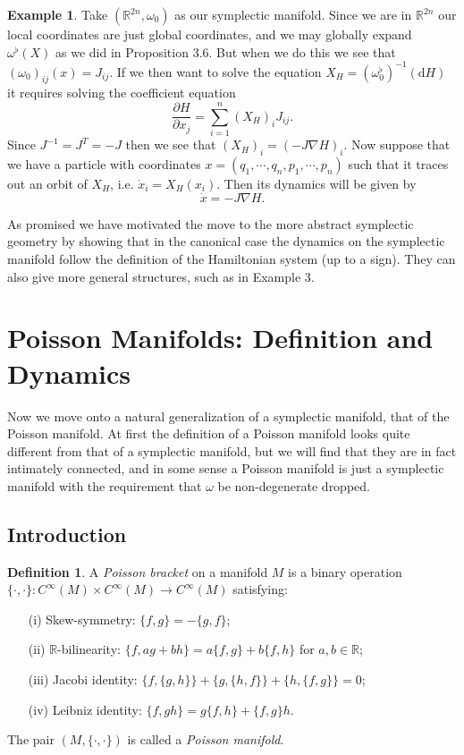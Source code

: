 \documentclass[psamsfonts,12pt]{amsart}
\newcommand\td{\mathrm{d}}
\newcommand\0{\mathbf{0}}
\newcommand\inv{^{-1}}
\theoremstyle{plain}
\theoremstyle{definition}
\newtheorem{dfn}[thm]{Definition} %
\newtheorem{ex}[thm]{Example} %
\newcommand{\bbR}{\mathbb{R}}
\begin{document}
\begin{ex}
Take $(\bbR^{2n},\omega_0)$ as our symplectic manifold.  Since we are in $\bbR^{2n}$ our local coordinates are just global coordinates, and we may globally expand $\omega^\flat(X)$ as we did in Proposition 3.6.  But when we do this we see that $(\omega_0)_{ij}(x)=J_{ij}$.  If we then want to solve the equation $X_H=(\omega_0^\flat)\inv (\td H)$ it requires solving the coefficient equation
\[
\frac{\partial H}{\partial x_j}= \sum_{i=1}^{n}(X_H)_i J_{ij}.
\]
Since $J\inv=J^T=-J$ then we see that $(X_H)_i = (-J\nabla H)_i$.  Now suppose that we have a particle with coordinates $x=(q_1,\cdots, q_n,p_1,\cdots, p_n)$ such that it traces out an orbit of $X_H$, i.e. $\dot{x}_i=X_H(x_i)$.  Then its dynamics will be given by 
\[
\dot{x}=-J\nabla H.
\]
\end{ex}

As promised we have motivated the move to the more abstract symplectic geometry by showing that in the canonical case the dynamics on the symplectic manifold follow the definition of the Hamiltonian system (up to a sign).  They can also give more general structures, such as in Example 3.










\section{Poisson Manifolds: Definition and Dynamics}

Now we move onto a natural generalization of a symplectic manifold, that of the Poisson manifold.  At first the definition of a Poisson manifold looks quite different from that of a symplectic manifold, but we will find that they are in fact intimately connected, and in some sense a Poisson manifold is just a symplectic manifold with the requirement that $\omega$ be non-degenerate dropped.

\subsection{Introduction}
\begin{dfn}
A \textit{Poisson bracket} on a manifold $M$ is a binary operation $\{\cdot, \cdot \} \colon C^\infty(M)\times C^\infty(M)\rightarrow C^\infty(M)$ satisfying:
\begin{enumerate}

\item[(i)] Skew-symmetry: $\{f,g\}=-\{g,f\}$;

\item[(ii)] $\bbR$-bilinearity: $\{f,ag+bh\}=a\{f,g\}+b\{f,h\}$ for $a,b\in \bbR$;

\item[(iii)] Jacobi identity: $\{f,\{g,h\}\}+\{g,\{h,f\}\}+\{h,\{f,g\}\}=0$;

\item[(iv)] Leibniz identity: $\{f,gh\}=g\{f,h\}+\{f,g\}h$.

\end{enumerate}
The pair $(M,\{\cdot,\cdot\})$ is called a \textit{Poisson manifold}.
\end{dfn}
\end{document}
